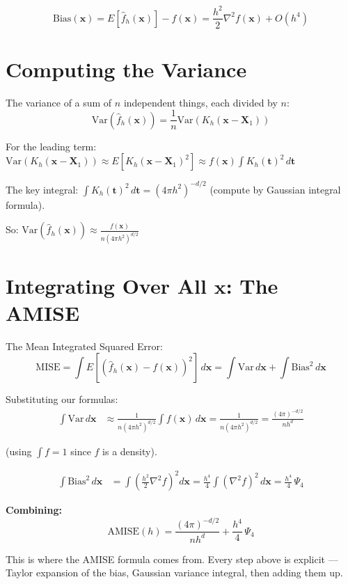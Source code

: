 \documentclass[12pt]{article}
\begin{document}
$$\text{Bias}(\mathbf{x}) = E[\hat{f}_h(\mathbf{x})] - f(\mathbf{x}) = \frac{h^2}{2}\nabla^2 f(\mathbf{x}) + O(h^4)$$

\section{Computing the Variance}

The variance of a sum of $n$ independent things, each divided by $n$:
$$\text{Var}(\hat{f}_h(\mathbf{x})) = \frac{1}{n}\text{Var}(K_h(\mathbf{x}-\mathbf{X}_1))$$

For the leading term: $\text{Var}(K_h(\mathbf{x}-\mathbf{X}_1)) \approx E[K_h(\mathbf{x}-\mathbf{X}_1)^2] \approx f(\mathbf{x})\int K_h(\mathbf{t})^2\,d\mathbf{t}$

The key integral: $\int K_h(\mathbf{t})^2\,d\mathbf{t} = (4\pi h^2)^{-d/2}$ (compute by Gaussian integral formula).

So: $\text{Var}(\hat{f}_h(\mathbf{x})) \approx \frac{f(\mathbf{x})}{n(4\pi h^2)^{d/2}}$

\section{Integrating Over All $\mathbf{x}$: The AMISE}

The Mean Integrated Squared Error:
$$\text{MISE} = \int E[(\hat{f}_h(\mathbf{x}) - f(\mathbf{x}))^2]\,d\mathbf{x} = \int\text{Var}\,d\mathbf{x} + \int\text{Bias}^2\,d\mathbf{x}$$

Substituting our formulas:
\begin{align*}
\int\text{Var}\,d\mathbf{x} &\approx \frac{1}{n(4\pi h^2)^{d/2}}\int f(\mathbf{x})\,d\mathbf{x} = \frac{1}{n(4\pi h^2)^{d/2}} = \frac{(4\pi)^{-d/2}}{nh^d}
\end{align*}

(using $\int f = 1$ since $f$ is a density).

\begin{align*}
\int\text{Bias}^2\,d\mathbf{x} &= \int\left(\frac{h^2}{2}\nabla^2 f\right)^2 d\mathbf{x} = \frac{h^4}{4}\int(\nabla^2 f)^2\,d\mathbf{x} = \frac{h^4}{4}\,\Psi_4
\end{align*}

\textbf{Combining:}
$$\boxed{\text{AMISE}(h) = \frac{(4\pi)^{-d/2}}{nh^d} + \frac{h^4}{4}\,\Psi_4}$$

This is where the AMISE formula comes from. Every step above is explicit --- Taylor expansion of the bias, Gaussian variance integral, then adding them up.
\end{document}
